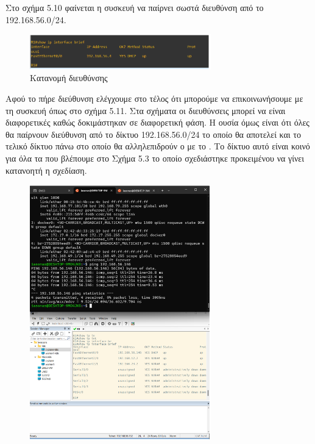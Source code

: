 \FloatBarrier

\noindent Στο σχήμα 5.10 φαίνεται η συσκευή να παίρνει σωστά  διευθύνση από το 192.168.56.0/24.

\FloatBarrier

\begin{figure}[htb]
	\centering
	\includegraphics[width=0.7\textwidth]{graphics/cisco_ip_address.png}
	\caption{Κατανομή  διευθύνσης}
\end{figure}

\FloatBarrier


\noindent Αφού το  πήρε  διεύθυνση ελέγχουμε στο τέλος ότι μπορούμε να επικοινωνήσουμε με τη συσκευή όπως στο σχήμα 5.11. Στα σχήματα οι  διευθύνσεις μπορεί να είναι διαφορετικές καθώς δοκιμάστηκαν σε διαφορετική φάση. Η ουσία όμως είναι ότι όλες θα παίρνουν  διεύθυνση από το δίκτυο 192.168.56.0/24 το οποίο θα αποτελεί και το τελικό δίκτυο πάνω στο οποίο θα αλληλεπιδρούν ο  με το . Το δίκτυο αυτό είναι κοινό για όλα τα  που βλέπουμε στο Σχήμα 5.3 το οποίο σχεδιάστηκε προκειμένου να γίνει κατανοητή η σχεδίαση.

\FloatBarrier

\begin{figure}[htb]
	\centering
	\includegraphics[width=0.7\textwidth]{graphics/ip_connectivity_test.png}
	\caption{}
\end{figure}

